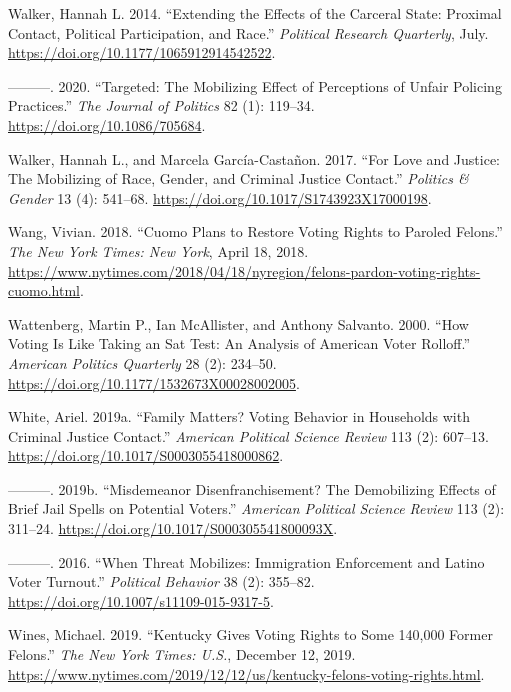 \documentclass[
  12pt,
]{article}
\newlength{\cslhangindent}
\newenvironment{cslreferences}%
  {\setlength{\parindent}{0pt}%
  \everypar{\setlength{\hangindent}{\cslhangindent}}\ignorespaces}%
  {\par}
\begin{document}
\begin{cslreferences}
\leavevmode\hypertarget{ref-Walker2014}{}%
Walker, Hannah L. 2014. ``Extending the Effects of the Carceral State: Proximal Contact, Political Participation, and Race.'' \emph{Political Research Quarterly}, July. \url{https://doi.org/10.1177/1065912914542522}.

\leavevmode\hypertarget{ref-Walker2020}{}%
---------. 2020. ``Targeted: The Mobilizing Effect of Perceptions of Unfair Policing Practices.'' \emph{The Journal of Politics} 82 (1): 119--34. \url{https://doi.org/10.1086/705684}.

\leavevmode\hypertarget{ref-Walker2017}{}%
Walker, Hannah L., and Marcela García-Castañon. 2017. ``For Love and Justice: The Mobilizing of Race, Gender, and Criminal Justice Contact.'' \emph{Politics \& Gender} 13 (4): 541--68. \url{https://doi.org/10.1017/S1743923X17000198}.

\leavevmode\hypertarget{ref-Wang2018}{}%
Wang, Vivian. 2018. ``Cuomo Plans to Restore Voting Rights to Paroled Felons.'' \emph{The New York Times: New York}, April 18, 2018. \url{https://www.nytimes.com/2018/04/18/nyregion/felons-pardon-voting-rights-cuomo.html}.

\leavevmode\hypertarget{ref-Wattenberg2000}{}%
Wattenberg, Martin P., Ian McAllister, and Anthony Salvanto. 2000. ``How Voting Is Like Taking an Sat Test: An Analysis of American Voter Rolloff.'' \emph{American Politics Quarterly} 28 (2): 234--50. \url{https://doi.org/10.1177/1532673X00028002005}.

\leavevmode\hypertarget{ref-White2019a}{}%
White, Ariel. 2019a. ``Family Matters? Voting Behavior in Households with Criminal Justice Contact.'' \emph{American Political Science Review} 113 (2): 607--13. \url{https://doi.org/10.1017/S0003055418000862}.

\leavevmode\hypertarget{ref-White2019}{}%
---------. 2019b. ``Misdemeanor Disenfranchisement? The Demobilizing Effects of Brief Jail Spells on Potential Voters.'' \emph{American Political Science Review} 113 (2): 311--24. \url{https://doi.org/10.1017/S000305541800093X}.

\leavevmode\hypertarget{ref-White2016}{}%
---------. 2016. ``When Threat Mobilizes: Immigration Enforcement and Latino Voter Turnout.'' \emph{Political Behavior} 38 (2): 355--82. \url{https://doi.org/10.1007/s11109-015-9317-5}.

\leavevmode\hypertarget{ref-Wines2019}{}%
Wines, Michael. 2019. ``Kentucky Gives Voting Rights to Some 140,000 Former Felons.'' \emph{The New York Times: U.S.}, December 12, 2019. \url{https://www.nytimes.com/2019/12/12/us/kentucky-felons-voting-rights.html}.
\end{cslreferences}
\end{document}
